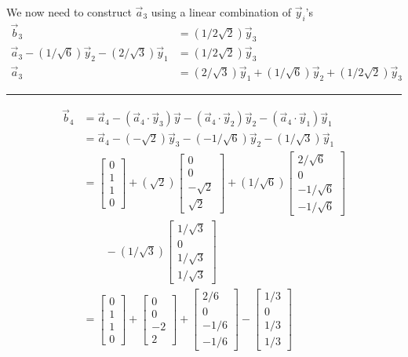 \documentclass{report}
\begin{document}
We now need to construct $\vec{a}_3$ using a linear combination of $\vec{y}_i$'s
$$
\begin{aligned}
\vec{b}_3 &= (1/2\sqrt{2})\vec{y}_3\\
\vec{a}_3-(1/\sqrt{6})\vec{y}_2-(2/\sqrt{3})\vec{y}_1 &= (1/2\sqrt{2})\vec{y}_3\\
\vec{a}_3 &=(2/\sqrt{3})\vec{y}_1 + (1/\sqrt{6})\vec{y}_2 + (1/2\sqrt{2})\vec{y}_3
\end{aligned}
$$
\vspace{0.5em}
\hrule
\vspace{0.5em}
\begin{minipage}{0.45\textwidth}
$$
\begin{aligned}
\vec{b}_4 &= \vec{a}_4 - (\vec{a}_4\cdot\vec{y}_3)\vec{y}-(\vec{a}_4\cdot\vec{y}_2)\vec{y}_2 - (\vec{a}_4\cdot\vec{y}_1)\vec{y}_1\\
&=\vec{a}_4 - (-\sqrt{2})\vec{y}_3-(-1/\sqrt{6})\vec{y}_2-(1/\sqrt{3})\vec{y}_1\\
&=\begin{bmatrix}0\\1\\1\\0\end{bmatrix}+(\sqrt{2})\begin{bmatrix}0\\0\\-\sqrt{2}\\\sqrt{2}\end{bmatrix}+(1/\sqrt{6})\begin{bmatrix}2/\sqrt{6}\\0\\-1/\sqrt{6}\\-1/\sqrt{6}\end{bmatrix}\\
&\qquad-(1/\sqrt{3})\begin{bmatrix}1/\sqrt{3}\\0\\1/\sqrt{3}\\1/\sqrt{3}\end{bmatrix}\\
&=\begin{bmatrix}0\\1\\1\\0\end{bmatrix}+\begin{bmatrix}0\\0\\-2\\2\end{bmatrix}+\begin{bmatrix}2/6\\0\\-1/6\\-1/6\end{bmatrix}-\begin{bmatrix}1/3\\0\\1/3\\1/3\end{bmatrix}\\

\end{aligned}$$
\end{minipage}
\end{document}

